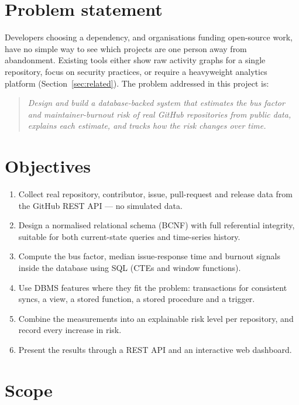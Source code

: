 \documentclass[11pt,a4paper]{report}
\begin{document}
\section{Problem statement}

Developers choosing a dependency, and organisations funding open-source work,
have no simple way to see which projects are one person away from
abandonment. Existing tools either show raw activity graphs for a single
repository, focus on security practices, or require a heavyweight analytics
platform (Section~\ref{sec:related}). The problem addressed in this project is:

\begin{quote}
\itshape
Design and build a database-backed system that estimates the bus factor and
maintainer-burnout risk of real GitHub repositories from public data,
explains each estimate, and tracks how the risk changes over time.
\end{quote}

\section{Objectives}

\begin{enumerate}
  \item Collect real repository, contributor, issue, pull-request and release
        data from the GitHub REST API --- no simulated data.
  \item Design a normalised relational schema (BCNF) with full referential
        integrity, suitable for both current-state queries and time-series
        history.
  \item Compute the bus factor, median issue-response time and burnout signals
        inside the database using SQL (CTEs and window functions).
  \item Use DBMS features where they fit the problem: transactions for
        consistent syncs, a view, a stored function, a stored procedure and a
        trigger.
  \item Combine the measurements into an explainable risk level per
        repository, and record every increase in risk.
  \item Present the results through a REST API and an interactive web
        dashboard.
\end{enumerate}

\section{Scope}
\end{document}

